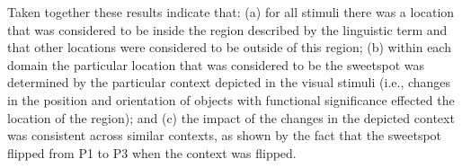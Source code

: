 \documentclass[11pt,letterpaper]{article}
\begin{document}



Taken together these results indicate that: (a) for all stimuli there was a location that was considered to be inside the region described by the linguistic term and that other locations were considered to be outside of this region; (b) within each domain the particular location that was considered to be the sweetspot was determined by the particular context depicted in the visual stimuli (i.e., changes in the position and orientation of objects with functional significance effected the location of the region); and (c) the impact of the changes in the depicted context was consistent across similar contexts, as shown by the fact that the sweetspot flipped from P1 to P3 when the context was flipped.
\end{document}
